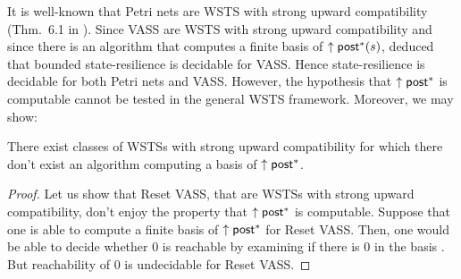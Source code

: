 It is well-known that Petri nets are WSTS with strong upward compatibility (Thm.~6.1 in \cite{DBLP:journals/tcs/FinkelS01}). 
Since VASS are WSTS with strong upward compatibility and since there is an algorithm that computes a finite basis of  $\uparrow \textsf{post}^*(s)$, \cite{DBLP:conf/gg/Ozkan22} deduced that bounded state-resilience is decidable for VASS.
Hence state-resilience is decidable for both Petri nets and VASS.
However, the hypothesis that $\uparrow \textsf{post}^*$ is computable cannot be tested in the general WSTS framework. Moreover, we may show:

\begin{proposition}
There exist classes of WSTSs with strong upward compatibility for which there don't exist an algorithm computing a basis of $\uparrow \textsf{post}^*$.
\end{proposition}


\begin{proof}
Let us show that Reset VASS, that are WSTSs with strong upward compatibility, don't enjoy the property that $\uparrow \textsf{post}^*$ is computable.
Suppose that one is able to compute a finite basis of $\uparrow \textsf{post}^*$ for Reset VASS. Then, one would be able to decide whether $0$ is reachable 
by examining if there is %
$0$ in the basis%
. But reachability of $0$  %
is undecidable for Reset VASS. 
\end{proof}



%
%
%






